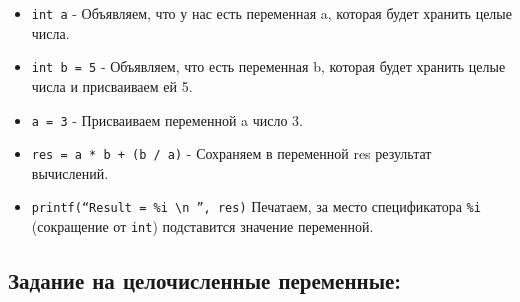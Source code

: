 \documentclass{article}
\begin{document}
\begin{itemize}
\item \texttt{int a} - Объявляем, что у нас есть переменная a, которая будет хранить целые числа.
\item \texttt{int b = 5} - Объявляем, что есть переменная b, которая будет хранить целые числа и присваиваем ей 5.
\item \texttt{a = 3} - Присваиваем переменной a число 3.
\item \texttt{res = a * b + (b / a)} - Сохраняем в переменной res результат вычислений.
\item \texttt{printf(``Result = \%i \textbackslash n '', res)} Печатаем, за место спецификатора \texttt{\%i} (сокращение от \texttt{int}) подставится значение переменной.
\end{itemize}
\subsection*{Задание на целочисленные переменные:}
\end{document}
